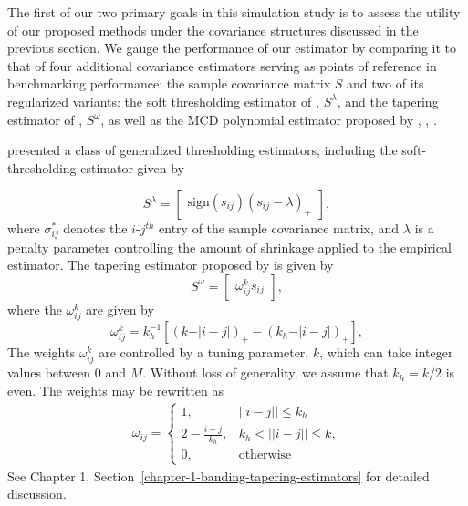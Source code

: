 The first of our two primary goals in this simulation study is to assess the utility of our proposed methods under the covariance structures discussed in the previous section. We gauge the performance of our estimator by comparing it to that of four additional covariance estimators serving as points of reference in benchmarking performance: the sample covariance matrix $S$ and two of its regularized variants: the soft thresholding estimator of \citet{rothman2009generalized},  $S^\lambda$, and the tapering estimator of \citet{cai2010optimal}, $S^\omega$, as well as the MCD polynomial estimator proposed by \citet{pourahmadi1999joint}, \citet{pan2006regression}, \citet{pourahmadi2002dynamic}. 

\bigskip

\citet{rothman2009generalized} presented a class of generalized thresholding estimators, including the soft-thresholding estimator given by

\[
S^{\lambda}=   \begin{bmatrix} \mbox{sign}\left(s_{ij}\right) \left(s_{ij} - \lambda\right)_+ \end{bmatrix},
\]
\noindent 
where $\sigma^*_{ij}$ denotes the $i$-$j^{th}$ entry of the sample covariance matrix, and $\lambda$ is a penalty parameter controlling the amount of shrinkage applied to the empirical estimator. The tapering estimator proposed by \citet{cai2010optimal} is given by
\[
S^{\omega} =  \begin{bmatrix} \omega_{ij}^k s_{ij} \end{bmatrix},
\]
\noindent
where the $\omega_{ij}^k$ are given by 
\begin{equation*}
\omega^k_{ij} = k_h^{-1} \left[ \left( k - \vert i-j\vert\right)_+ - \left(k_h - \vert i-j\vert\right)_+ \right],
\end{equation*}
\noindent
The weights $\omega^k_{ij}$ are controlled by a tuning parameter, $k$,  which can take integer values between 0 and $M$. Without loss of generality,  we assume that $k_h = k/2$ is even. The weights may be rewritten as
\begin{align*}
\omega_{ij} = \left\{\begin{array}{ll} 1, & \vert \vert i -j \vert \vert \le k_h \\
                             2 - \frac{i - j}{k_h}, & k_h < \vert \vert i -j \vert \vert \le k, \\
                             0, & \mbox{otherwise}  \end{array} \right.
\end{align*}
\noindent
See Chapter 1, Section~\ref{chapter-1-banding-tapering-estimators} for detailed discussion.
\bigskip

